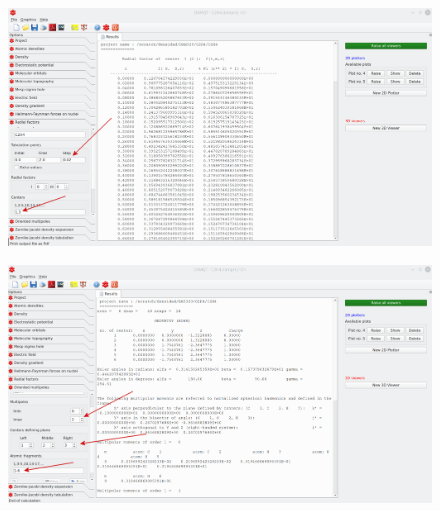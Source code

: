 \documentclass[a4paper,10pt]{article}
\begin{document}
\begin{minipage}{.5\linewidth}
\begin{figure}[H]
\caption{\label{fig:19}}
\begin{center}
\includegraphics[width=0.95\linewidth]{damqt_QS_fig19.png}
\end{center}
\end{figure} 
\end{minipage}
\begin{minipage}{.5\linewidth}
\begin{figure}[H]
\caption{\label{fig:20}}
\begin{center}
\includegraphics[width=0.95\linewidth]{damqt_QS_fig20.png}
\end{center}
\end{figure} 
\end{minipage}
\end{document}
